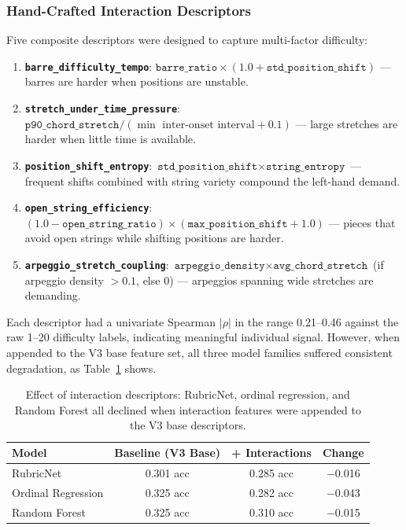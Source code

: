 \subsubsection{Hand-Crafted Interaction Descriptors}
Five composite descriptors were designed to capture multi-factor difficulty:
\begin{enumerate}
    \item \textbf{\texttt{barre\_difficulty\_tempo}}: $\texttt{barre\_ratio} \times (1.0 + \texttt{std\_position\_shift})$ --- barres are harder when positions are unstable.
    \item \textbf{\texttt{stretch\_under\_time\_pressure}}: $\texttt{p90\_chord\_stretch} / (\min \text{ inter-onset interval} + 0.1)$ --- large stretches are harder when little time is available.
    \item \textbf{\texttt{position\_shift\_entropy}}: $\texttt{std\_position\_shift} \times \texttt{string\_entropy}$ --- frequent shifts combined with string variety compound the left-hand demand.
    \item \textbf{\texttt{open\_string\_efficiency}}: $(1.0 - \texttt{open\_string\_ratio}) \times (\texttt{max\_position\_shift} + 1.0)$ --- pieces that avoid open strings while shifting positions are harder.
    \item \textbf{\texttt{arpeggio\_stretch\_coupling}}: $\texttt{arpeggio\_density} \times \texttt{avg\_chord\_stretch}$ (if arpeggio density $> 0.1$, else 0) --- arpeggios spanning wide stretches are demanding.
\end{enumerate}
Each descriptor had a univariate Spearman $|\rho|$ in the range 0.21--0.46 against the raw 1--20 difficulty labels, indicating meaningful individual signal. However, when appended to the V3 base feature set, all three model families suffered consistent degradation, as Table~\ref{tab:interaction_results} shows.

\begin{table}[htbp]
\centering
\caption{Effect of interaction descriptors: RubricNet, ordinal regression, and Random Forest all declined when interaction features were appended to the V3 base descriptors.}
\label{tab:interaction_results}
\begin{tabular}{lccc}
\toprule
\textbf{Model} & \textbf{Baseline (V3 Base)} & \textbf{+ Interactions} & \textbf{Change} \\
\midrule
RubricNet & 0.301 acc & 0.285 acc & $-$0.016 \\
Ordinal Regression & 0.325 acc & 0.282 acc & $-$0.043 \\
Random Forest & 0.325 acc & 0.310 acc & $-$0.015 \\
\bottomrule
\end{tabular}
\end{table}

